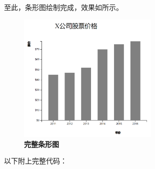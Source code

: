 至此，条形图绘制完成，效果如所示。

\begin{figure}[htbp]
    \centering
    \includegraphics[width=0.6\textwidth]{figure/D3/company_bar_chart_complete.png}
    \caption{\textbf{完整条形图}}
    \label{fig:company_bar_chart_complete}
\end{figure}

以下附上完整代码：

